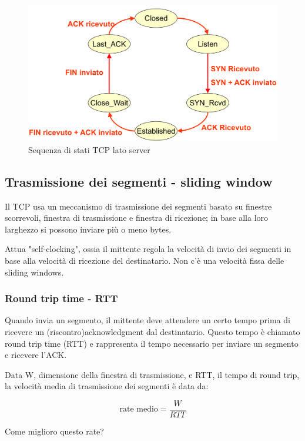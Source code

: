 \begin{figure}[h!]
    \centering
    \includegraphics[width=1\textwidth]{images/tcpstatiserver.png}
    \caption{Sequenza di stati TCP lato server}
    \label{fig:tcpstateserver}
    \end{figure}
\newpage

\subsection{Trasmissione dei segmenti - sliding window}
Il TCP usa un meccanismo di trasmissione dei segmenti basato su finestre scorrevoli, finestra di trasmissione e finestra di ricezione; in base alla loro larghezzo si possono inviare più o meno bytes.

Attua "self-clocking", ossia il mittente regola la velocità di invio dei segmenti in base alla velocità di ricezione del destinatario. Non c'è una velocità fissa delle sliding windows.

 \subsubsection{Round trip time - RTT}
Quando invia un segmento, il mittente deve attendere un certo tempo prima di ricevere un (riscontro)acknowledgment dal destinatario. Questo tempo è chiamato round trip time (RTT) e rappresenta il tempo necessario per inviare un segmento e ricevere l'ACK.
 
Data W, dimensione della finestra di trasmissione, e RTT, il tempo di round trip, la velocità media di trasmissione dei segmenti è data da:

\begin{equation}
    \text{rate medio} = \frac{W}{RTT}
\end{equation}

Come miglioro questo rate? 

